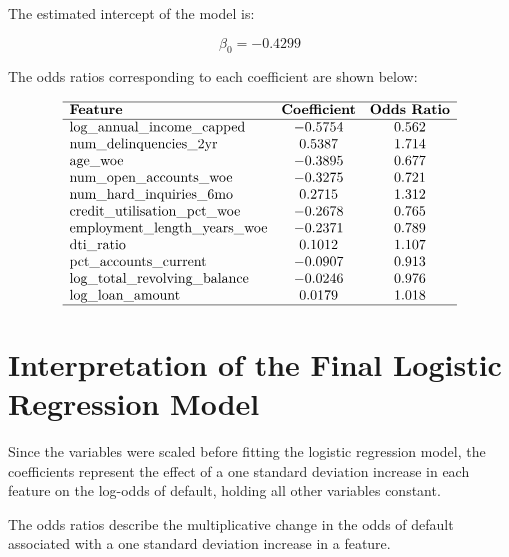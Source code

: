 \documentclass[
  letterpaper,
  DIV=11,
  numbers=noendperiod]{scrartcl}
\begin{document}
The estimated intercept of the model is:

\[
\beta_0 = -0.4299\]

The odds ratios corresponding to each coefficient are shown below:

\[
\begin{array}{lcc}
\hline
\textbf{Feature} & \textbf{Coefficient} & \textbf{Odds Ratio} \\
\hline
\text{log\_annual\_income\_capped} & -0.5754 & 0.562 \\
\text{num\_delinquencies\_2yr} & 0.5387 & 1.714 \\
\text{age\_woe} & -0.3895 & 0.677 \\
\text{num\_open\_accounts\_woe} & -0.3275 & 0.721 \\
\text{num\_hard\_inquiries\_6mo} & 0.2715 & 1.312 \\
\text{credit\_utilisation\_pct\_woe} & -0.2678 & 0.765 \\
\text{employment\_length\_years\_woe} & -0.2371 & 0.789 \\
\text{dti\_ratio} & 0.1012 & 1.107 \\
\text{pct\_accounts\_current} & -0.0907 & 0.913 \\
\text{log\_total\_revolving\_balance} & -0.0246 & 0.976 \\
\text{log\_loan\_amount} &  0.0179 & 1.018  \\
\hline
\end{array}\]

\section{Interpretation of the Final Logistic Regression Model}

Since the variables were scaled before fitting the logistic regression
model, the coefficients represent the effect of a one standard deviation
increase in each feature on the log-odds of default, holding all other
variables constant.

The odds ratios describe the multiplicative change in the odds of
default associated with a one standard deviation increase in a feature.
\end{document}
